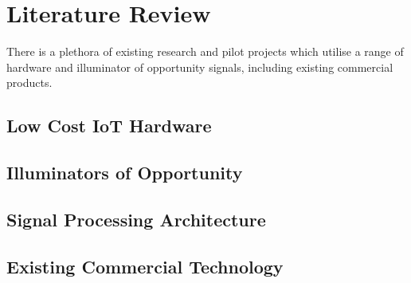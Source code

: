 \chapter{Literature Review \label{sec:litReview}}


There is a plethora of existing research and pilot projects which utilise a range of hardware and illuminator of opportunity signals, including existing commercial products.

\section{Low Cost IoT Hardware}

\section{Illuminators of Opportunity}

\section{Signal Processing Architecture}

\section{Existing Commercial Technology}